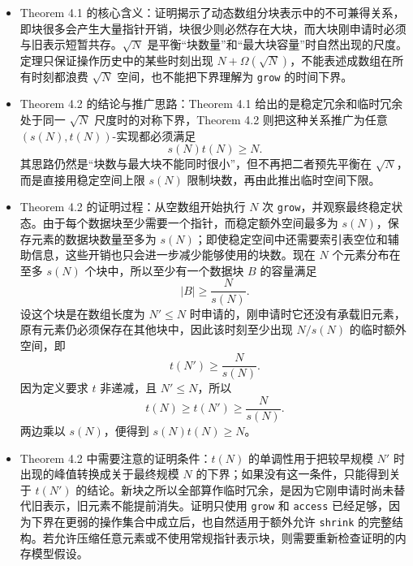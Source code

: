 \documentclass[UTF8,11pt,a4paper]{ctexart}
\newcommand{\op}[1]{\textnormal{\texttt{#1}}}
\begin{document}
\begin{itemize}
  若 $k<\sqrt{N}$，由于 $k$ 个数据块必须共同容纳 $N$ 个元素，由平均值原理，至少存在一个容量为 $\ell$ 的块满足
  \[
    \ell\geq \frac{N}{k}>\sqrt{N}.
  \]
  设这个大块是在数组长度为某个 $N'\leq N$ 时申请的。就在申请完成而元素尚未复制进去的时刻，新块仍为空，原有的 $N'$ 个元素必须完整保存在其他旧块中，所以当时总空间至少为 $N'+\ell$。又因为
  \[
    \ell>\sqrt{N}\geq\sqrt{N'},
  \]
  所以该历史时刻的空间严格大于 $N'+\sqrt{N'}$。这里的下界不一定出现在最终状态，而可能出现在过去某次 \op{grow} 分配大块时的瞬时峰值。

  \item Theorem 4.1 的核心含义：证明揭示了动态数组分块表示中的不可兼得关系，即块很多会产生大量指针开销，块很少则必然存在大块，而大块刚申请时必须与旧表示短暂共存。$\sqrt{N}$ 是平衡“块数量”和“最大块容量”时自然出现的尺度。定理只保证操作历史中的某些时刻出现 $N+\Omega(\sqrt{N})$，不能表述成数组在所有时刻都浪费 $\sqrt{N}$ 空间，也不能把下界理解为 \op{grow} 的时间下界。

  \item Theorem 4.2 的结论与推广思路：Theorem 4.1 给出的是稳定冗余和临时冗余处于同一 $\sqrt{N}$ 尺度时的对称下界，Theorem 4.2 则把这种关系推广为任意 $(s(N),t(N))$-实现都必须满足
  \[
    s(N)t(N)\geq N.
  \]
  其思路仍然是“块数与最大块不能同时很小”，但不再把二者预先平衡在 $\sqrt{N}$，而是直接用稳定空间上限 $s(N)$ 限制块数，再由此推出临时空间下限。

  \item Theorem 4.2 的证明过程：从空数组开始执行 $N$ 次 \op{grow}，并观察最终稳定状态。由于每个数据块至少需要一个指针，而稳定额外空间最多为 $s(N)$，保存元素的数据块数量至多为 $s(N)$；即使稳定空间中还需要索引表空位和辅助信息，这些开销也只会进一步减少能够使用的块数。现在 $N$ 个元素分布在至多 $s(N)$ 个块中，所以至少有一个数据块 $B$ 的容量满足
  \[
    |B|\geq\frac{N}{s(N)}.
  \]
  设这个块是在数组长度为 $N'\leq N$ 时申请的，刚申请时它还没有承载旧元素，原有元素仍必须保存在其他块中，因此该时刻至少出现 $N/s(N)$ 的临时额外空间，即
  \[
    t(N')\geq\frac{N}{s(N)}.
  \]
  因为定义要求 $t$ 非递减，且 $N'\leq N$，所以
  \[
    t(N)\geq t(N')\geq\frac{N}{s(N)}.
  \]
  两边乘以 $s(N)$，便得到 $s(N)t(N)\geq N$。

  \item Theorem 4.2 中需要注意的证明条件：$t(N)$ 的单调性用于把较早规模 $N'$ 时出现的峰值转换成关于最终规模 $N$ 的下界；如果没有这一条件，只能得到关于 $t(N')$ 的结论。新块之所以全部算作临时冗余，是因为它刚申请时尚未替代旧表示，旧元素不能提前消失。证明只使用 \op{grow} 和 \op{access} 已经足够，因为下界在更弱的操作集合中成立后，也自然适用于额外允许 \op{shrink} 的完整结构。若允许压缩任意元素或不使用常规指针表示块，则需要重新检查证明的内存模型假设。


\end{itemize}
\end{document}
